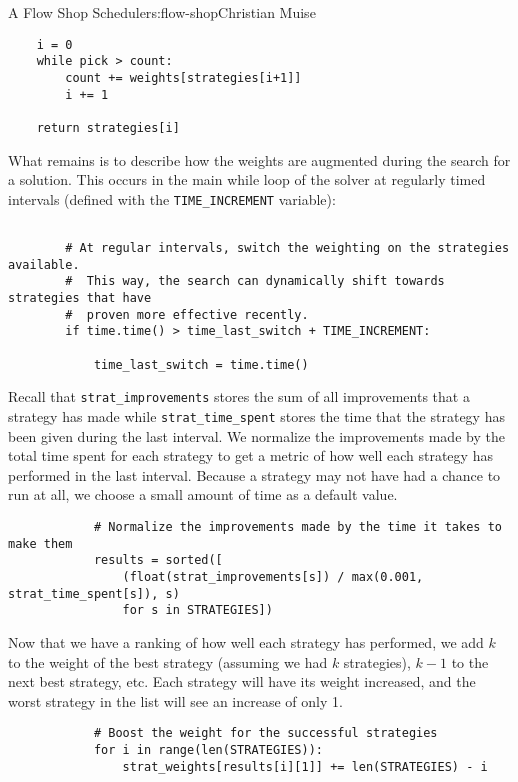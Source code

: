 \begin{aosachapter}{A Flow Shop Scheduler}{s:flow-shop}{Christian Muise}
\begin{verbatim}
    i = 0
    while pick > count:
        count += weights[strategies[i+1]]
        i += 1

    return strategies[i]
\end{verbatim}

What remains is to describe how the weights are augmented during the
search for a solution. This occurs in the main while loop of the solver
at regularly timed intervals (defined with the \texttt{TIME\_INCREMENT}
variable):

\begin{verbatim}

        # At regular intervals, switch the weighting on the strategies available.
        #  This way, the search can dynamically shift towards strategies that have
        #  proven more effective recently.
        if time.time() > time_last_switch + TIME_INCREMENT:

            time_last_switch = time.time()
\end{verbatim}

Recall that \texttt{strat\_improvements} stores the sum of all
improvements that a strategy has made while \texttt{strat\_time\_spent}
stores the time that the strategy has been given during the last
interval. We normalize the improvements made by the total time spent for
each strategy to get a metric of how well each strategy has performed in
the last interval. Because a strategy may not have had a chance to run
at all, we choose a small amount of time as a default value.

\begin{verbatim}
            # Normalize the improvements made by the time it takes to make them
            results = sorted([
                (float(strat_improvements[s]) / max(0.001, strat_time_spent[s]), s)
                for s in STRATEGIES])
\end{verbatim}

Now that we have a ranking of how well each strategy has performed, we
add $k$ to the weight of the best strategy (assuming we had $k$
strategies), $k-1$ to the next best strategy, etc. Each strategy will
have its weight increased, and the worst strategy in the list will see
an increase of only 1.

\begin{verbatim}
            # Boost the weight for the successful strategies
            for i in range(len(STRATEGIES)):
                strat_weights[results[i][1]] += len(STRATEGIES) - i
\end{verbatim}


\end{aosachapter}
